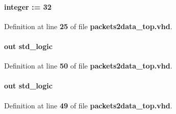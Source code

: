 \paragraph[{in\+\_\+pct\+\_\+data\+\_\+w}]{ {\bfseries \textcolor{vhdlchar}{ }} {\bfseries \textcolor{comment}{integer}\textcolor{vhdlchar}{ }\textcolor{vhdlchar}{ }\textcolor{vhdlchar}{\+:}\textcolor{vhdlchar}{=}\textcolor{vhdlchar}{ }\textcolor{vhdlchar}{ } \textcolor{vhdldigit}{32} \textcolor{vhdlchar}{ }} \hspace{0.3cm}{\ttfamily [Generic]}}\label{classpackets2data__top_a95676500d5b1dd663594499d9fcca396}


Definition at line {\bf 25} of file {\bf packets2data\+\_\+top.\+vhd}.

\paragraph[{in\+\_\+pct\+\_\+full}]{ {\bfseries \textcolor{keywordflow}{out}\textcolor{vhdlchar}{ }} {\bfseries \textcolor{comment}{std\+\_\+logic}\textcolor{vhdlchar}{ }} \hspace{0.3cm}{\ttfamily [Port]}}\label{classpackets2data__top_a178b9d9b3d5e363493d32dbceb85b15a}


Definition at line {\bf 50} of file {\bf packets2data\+\_\+top.\+vhd}.

\paragraph[{in\+\_\+pct\+\_\+last}]{ {\bfseries \textcolor{keywordflow}{out}\textcolor{vhdlchar}{ }} {\bfseries \textcolor{comment}{std\+\_\+logic}\textcolor{vhdlchar}{ }} \hspace{0.3cm}{\ttfamily [Port]}}\label{classpackets2data__top_ab6c9da964c28a4fa14bfc01c4c6abbd2}


Definition at line {\bf 49} of file {\bf packets2data\+\_\+top.\+vhd}.

